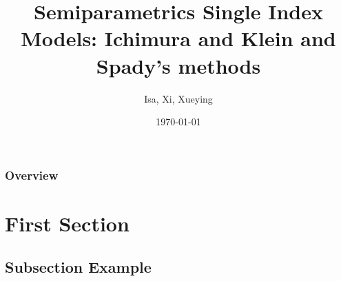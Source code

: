 \documentclass{beamer}
\title[Semiparametrics Single Index Models]{Semiparametrics Single Index Models: Ichimura and Klein and Spady's methods} %
\author{Isa, Xi, Xueying} %
\institute[University of Bonn] %
{
Project Module Econometrics and Statistics \\ %
\medskip
\textit{University of Bonn} %
}
\date{\today} %
\begin{document}
\begin{frame}
\titlepage %
\end{frame}

\begin{frame}
\frametitle{Overview} %
\tableofcontents %
\end{frame}


\section{First Section} %

\subsection{Subsection Example} %


\end{document}
